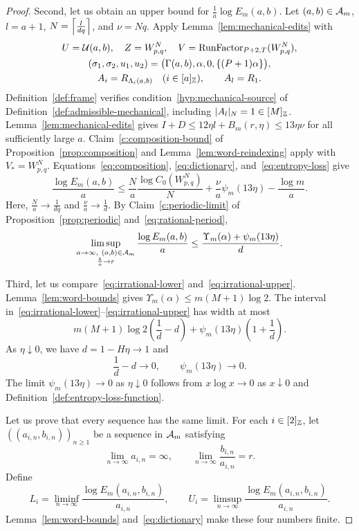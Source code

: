 \begin{proof}
Second, let us obtain an upper bound for $\frac1a\log E_m(a,b)$.
Let $(a,b)\in\mathcal A_m$, $l=a+1$, $N=\left\lceil\frac{l}{dq}\right\rceil$, and $\nu=Nq$.
Apply Lemma~\ref{lem:mechanical-edits} with
\[
\begin{gathered}
 U=\mathcal U(a,b),\quad Z=W_{p,q}^N,\quad
 V=\operatorname{RunFactor}_{P+2,T}(W_{p,q}^N),\\
 (\sigma_1,\sigma_2,u_1,u_2)
 =\bigl(\Gamma(a,b),\alpha,0,\{(P+1)\alpha\}\bigr),\\
 A_i=R_{\Lambda_i(a,b)}\quad(i\in[a]_{\mathbb Z}),\qquad A_l=R_1.
\end{gathered}
\]
Definition~\ref{def:frame} verifies condition~\ref{hyp:mechanical-source} of Definition~\ref{def:admissible-mechanical}, including $|A_l|_N=1\in[M]_{\mathbb Z}$.
Lemma~\ref{lem:mechanical-edits} gives $I+D\le12\eta l+B_m(r,\eta)\le13\eta\nu$
for all sufficiently large $a$.
Claim~\ref{c:composition-bound} of Proposition~\ref{prop:composition}
and Lemma~\ref{lem:word-reindexing} apply with $V_*=W_{p,q}^N$.
Equations~\eqref{eq:composition}, \eqref{eq:dictionary}, and~\eqref{eq:entropy-loss} give
\[
 \frac{\log E_m(a,b)}a
 \le\frac{N}{a}\frac{\log C_0(W_{p,q}^N)}N
 +\frac{\nu}{a}\psi_m(13\eta)-\frac{\log m}{a}.
\]
Here, $\frac Na\to\frac1{dq}$ and $\frac\nu a\to\frac1d$. By Claim~\ref{c:periodic-limit} of Proposition~\ref{prop:periodic} and~\eqref{eq:rational-period},
\begin{equation}\label{eq:irrational-upper}
 \limsup_{\substack{a\to\infty,\ (a,b)\in\mathcal A_m\\\frac{b}{a}\to r}}
 \frac{\log E_m(a,b)}a
 \le\frac{\Upsilon_m(\alpha)+\psi_m(13\eta)}d.
\end{equation}


Third, let us compare~\eqref{eq:irrational-lower} and~\eqref{eq:irrational-upper}. Lemma~\ref{lem:word-bounds} gives
$\Upsilon_m(\alpha)\le m(M+1)\log2$.
The interval in~\eqref{eq:irrational-lower}--\eqref{eq:irrational-upper} has width at most
\[
 m(M+1)\log2\left(\frac1d-d\right)
      +\psi_m(13\eta)\left(1+\frac1d\right).
\]
As $\eta\downarrow0$, we have $d=1-H\eta\to1$ and
\[
 \frac1d-d\longrightarrow0,\qquad
 \psi_m(13\eta)\longrightarrow0.
\]
The limit $\psi_m(13\eta)\to0$ as $\eta\downarrow0$ follows from $x\log x\to0$ as $x\downarrow0$ and Definition~\ref{def:entropy-loss-function}.

Let us prove that every sequence has the same limit.
For each $i\in[2]_{\mathbb Z}$, let $((a_{i,n},b_{i,n}))_{n\ge1}$ be a sequence in $\mathcal A_m$ satisfying
\[
 \lim_{n\to\infty}a_{i,n}=\infty,\qquad
 \lim_{n\to\infty}\frac{b_{i,n}}{a_{i,n}}=r.
\]
Define
\[
 L_i=\liminf_{n\to\infty}\frac{\log E_m(a_{i,n},b_{i,n})}{a_{i,n}},\qquad
 U_i=\limsup_{n\to\infty}\frac{\log E_m(a_{i,n},b_{i,n})}{a_{i,n}}.
\]
Lemma~\ref{lem:word-bounds} and~\eqref{eq:dictionary} make these four numbers finite.


\end{proof}
